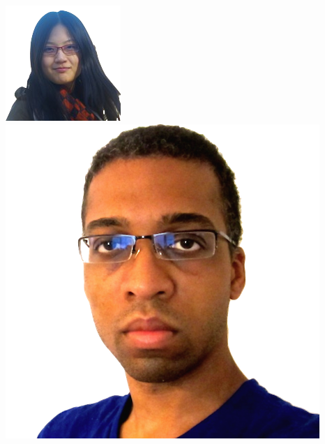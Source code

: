 \documentclass[compress]{beamer}
\begin{document}
\begin{frame}{}
  \begin{columns}
    \begin{center}
        \includegraphics[width=0.8\linewidth]{general_figures/hehe} \\
        \includegraphics[width=0.8\linewidth]{general_figures/alvin}
        \\

\end{center}
\end{columns}
\end{frame}
\end{document}
